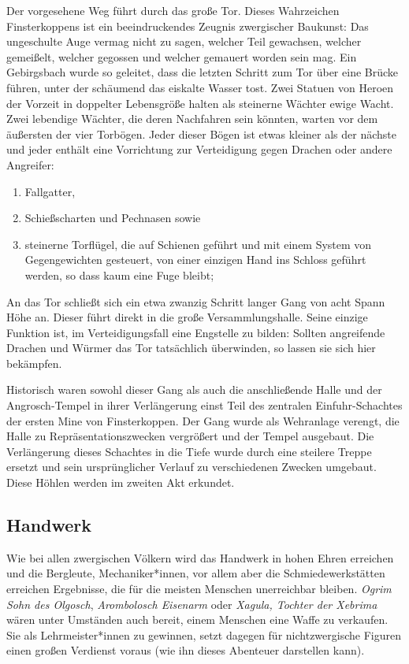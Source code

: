 \documentclass[openright]{Ilaris}
\begin{document}
Der vorgesehene Weg führt durch das große Tor.
Dieses Wahrzeichen Finsterkoppens ist ein beeindruckendes Zeugnis zwergischer Baukunst:
Das ungeschulte Auge vermag nicht zu sagen, welcher Teil gewachsen, welcher gemeißelt, welcher gegossen und welcher gemauert worden sein mag.
Ein Gebirgsbach wurde so geleitet, dass die letzten Schritt zum Tor über eine Brücke führen, unter der schäumend das eiskalte Wasser tost.
Zwei Statuen von Heroen der Vorzeit in doppelter Lebensgröße halten als steinerne Wächter ewige Wacht.
Zwei lebendige Wächter, die deren Nachfahren sein könnten, warten vor dem äußersten der vier Torbögen.
Jeder dieser Bögen ist etwas kleiner als der nächste und  jeder enthält eine Vorrichtung zur Verteidigung gegen Drachen oder andere Angreifer:
\begin{enumerate}\setlength\itemsep {0em}
	\item Fallgatter,
	\item Schießscharten und Pechnasen sowie
	\item steinerne Torflügel, die auf Schienen geführt und mit einem System von Gegengewichten gesteuert, von einer einzigen Hand ins Schloss geführt werden, so dass kaum eine Fuge bleibt;
\end{enumerate}

An das Tor schließt sich ein etwa zwanzig Schritt langer Gang von acht Spann Höhe an.
Dieser führt direkt in die große Versammlungshalle.
Seine einzige Funktion ist, im Verteidigungsfall eine Engstelle zu bilden:
Sollten angreifende Drachen und Würmer das Tor tatsächlich überwinden, so lassen sie sich hier bekämpfen.

Historisch waren sowohl dieser Gang als auch die anschließende Halle und der Angrosch-Tempel in ihrer Verlängerung einst Teil des zentralen Einfuhr-Schachtes der ersten Mine von Finsterkoppen.
Der Gang wurde als Wehranlage verengt, die Halle zu Repräsentationszwecken vergrößert und der Tempel ausgebaut. 
Die Verlängerung dieses Schachtes in die Tiefe wurde durch eine steilere Treppe ersetzt und sein ursprünglicher Verlauf zu verschiedenen Zwecken umgebaut. Diese Höhlen werden im zweiten Akt erkundet.

\subsection{Handwerk}
Wie bei allen zwergischen Völkern wird das Handwerk in hohen Ehren erreichen und die Bergleute, Mechaniker*innen, vor allem aber die Schmiedewerkstätten erreichen Ergebnisse, die für die meisten Menschen unerreichbar bleiben. \emph{Ogrim Sohn des Olgosch}, \emph{Arombolosch Eisenarm} oder \emph{Xagula, Tochter der Xebrima} wären unter Umständen auch bereit, einem Menschen eine Waffe zu verkaufen. Sie als Lehrmeister*innen zu gewinnen, setzt dagegen für nichtzwergische Figuren einen großen Verdienst voraus (wie ihn dieses Abenteuer darstellen kann).
\end{document}

